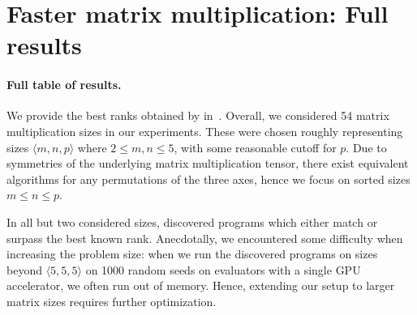 \section{Faster matrix multiplication: Full results}

\paragraph{Full table of results.} We provide the best ranks obtained by \method in~. Overall, we considered 54 matrix multiplication sizes in our experiments. These were chosen roughly representing sizes $\langle m,n,p \rangle$ where $2\leq m,n\leq 5$, with some reasonable cutoff for $p$. Due to symmetries of the underlying matrix multiplication tensor, there exist equivalent algorithms for any permutations of the three axes, hence we focus on sorted sizes $m\leq n\leq p$.

In all but two considered sizes, \method discovered programs which either match or surpass the best known rank. Anecdotally, we encountered some difficulty when increasing the problem size: when we run the discovered programs on sizes beyond $\langle 5,5,5 \rangle$ on 1000 random seeds on evaluators with a single GPU accelerator, we often run out of memory. Hence, extending our setup to larger matrix sizes requires further optimization.

